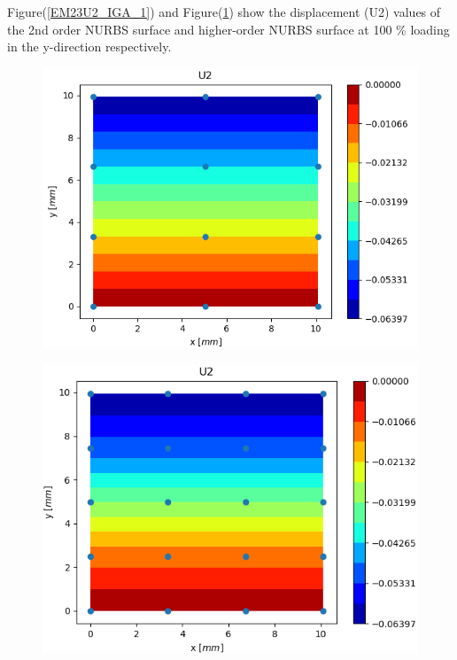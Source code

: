 \documentclass[11pt]{article}
\begin{document}
\noindent
Figure(\ref{EM23U2_IGA_1}) and Figure(\ref{HEM12U2_IGA}) show the displacement (U2) values of the 2nd order NURBS surface and higher-order NURBS surface at 100 \% loading in the y-direction respectively. \\

\begin{figure}[H]
	\centering
	\begin{minipage}{.5\textwidth}
		\centering
		\includegraphics[width=1\linewidth]{EM23U2_IGA.png}
		\label{EM23U2_IGA_1}
	\end{minipage}%
	\begin{minipage}{.5\textwidth}
		\centering
		\includegraphics[width=1\linewidth]{HEM12U2_IGA.png}
		\label{HEM12U2_IGA}
	\end{minipage}
\end{figure}
\end{document}
